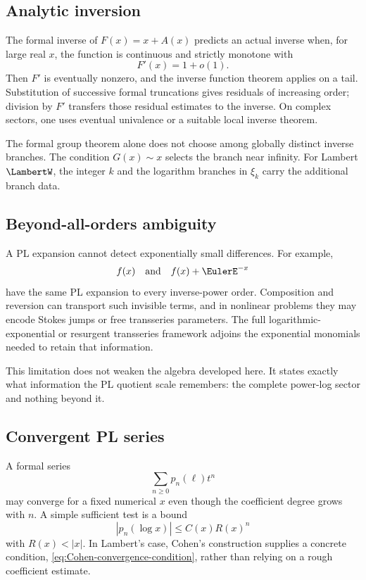 \documentclass[11pt,oneside]{article}
\numberwithin{equation}{section}
\theoremstyle{definition}
\newcommand{\as}{\sim}
\begin{document}
\subsection{Analytic inversion}

The formal inverse of \(F(x)=x+A(x)\) predicts an actual inverse when, for large
real \(x\), the function is continuous and strictly monotone with
\[
  F'(x)=1+o(1).
\]
Then \(F'\) is eventually nonzero, and the inverse function theorem applies on
a tail.  Substitution of successive formal truncations gives residuals of
increasing order; division by \(F'\) transfers those residual estimates to the
inverse.  On complex sectors, one uses eventual univalence or a suitable local
inverse theorem.

The formal group theorem alone does not choose among globally distinct inverse
branches.  The condition \(G(x)\as x\) selects the branch near infinity.  For
Lambert \(\LambertW\), the integer \(k\) and the logarithm branches in \(\xi_k\) carry the
additional branch data.

\subsection{Beyond-all-orders ambiguity}

A PL expansion cannot detect exponentially small differences.  For example,
\[
  f(x)\quad\text{and}\quad f(x)+\EulerE^{-x}
\]
have the same PL expansion to every inverse-power order.  Composition and
reversion can transport such invisible terms, and in nonlinear problems they
may encode Stokes jumps or free transseries parameters.  The full
logarithmic-exponential or resurgent transseries framework adjoins the
exponential monomials needed to retain that information.

This limitation does not weaken the algebra developed here.  It states exactly
what information the PL quotient scale remembers: the complete power-log sector
and nothing beyond it.

\subsection{Convergent PL series}

A formal series
\[
  \sum_{n\ge0}p_n(\ell)t^n
\]
may converge for a fixed numerical \(x\) even though the coefficient degree
grows with \(n\).  A simple sufficient test is a bound
\[
  |p_n(\log x)|\le C(x)R(x)^n
\]
with \(R(x)<|x|\).  In Lambert's case, Cohen's construction supplies a concrete
condition, \eqref{eq:Cohen-convergence-condition}, rather than relying on a
rough coefficient estimate.
\end{document}
